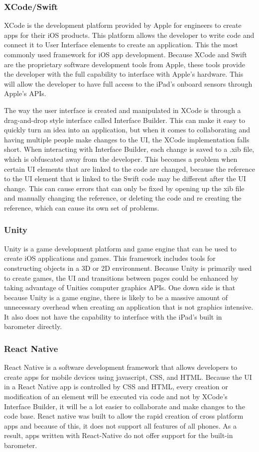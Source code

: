 \documentclass[onecolumn, draftclsnofoot,10pt, compsoc]{IEEEtran}
\begin{document}
\subsubsection{XCode/Swift}
XCode is the development platform provided by Apple for engineers to create apps for their iOS products.
This platform allows the developer to write code and connect it to User Interface elements to create an application. This the most commonly used framework for iOS app development.
Because XCode and Swift are the proprietary software development tools from Apple, these tools provide the developer with the full capability to interface with Apple's hardware.
This will allow the developer to have full access to the iPad's onboard sensors through Apple's APIs.

The way the user interface is created and manipulated in XCode is through a drag-and-drop style interface called Interface Builder.
This can make it easy to quickly turn an idea into an application, but when it comes to collaborating and having multiple people make changes to the UI, the XCode implementation falls short.
When interacting with Interface Builder, each change is saved to a .xib file, which is obfuscated away from the developer.
This becomes a problem when certain UI elements that are linked to the code are changed, because the reference to the UI element that is linked to the Swift code may be different after the UI change.
This can cause errors that can only be fixed by opening up the xib file and manually changing the reference, or deleting the code and re creating the reference, which can cause its own set of problems.

\subsubsection{Unity}
Unity is a game development platform and game engine that can be used to create iOS applications and games.
This framework includes tools for constructing objects in a 3D or 2D environment.
Because Unity is primarily used to create games, the UI and transitions between pages could be enhanced by taking advantage of Unities computer graphics APIs.
One down side is that because Unity is a game engine, there is likely to be a massive amount of unnecessary overhead when creating an application that is not graphics intensive.
It also does not have the capability to interface with the iPad's built in barometer directly.

\subsubsection{React Native}
React Native is a software development framework that allows developers to create apps for mobile devices using javascript, CSS, and HTML.
Because the UI in a React Native app is controlled by CSS and HTML, every creation or modification of an element will be executed via code and not by XCode's Interface Builder, it will be a lot easier to collaborate and make changes to the code base.
React native was built to allow the rapid creation of cross platform apps and because of this, it does not support all features of all phones.
As a result, apps written with React-Native do not offer support for the built-in barometer.
\end{document}
